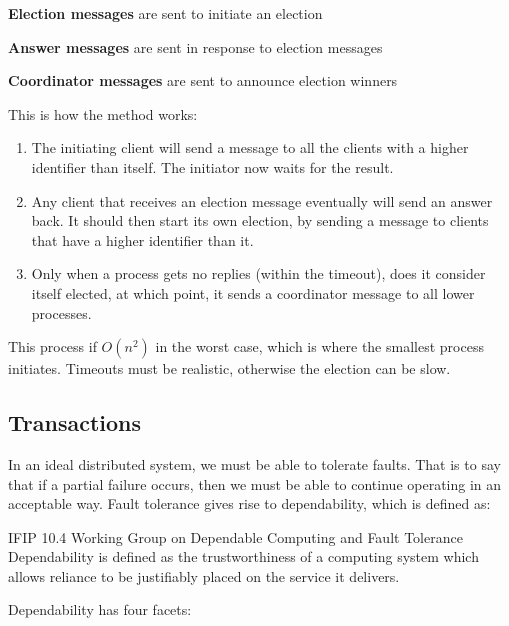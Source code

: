 \begin{description}
  \item \textbf{Election messages} are sent to initiate an election
  \item \textbf{Answer messages} are sent in response to election messages
  \item \textbf{Coordinator messages} are sent to announce election winners
\end{description}

This is how the method works:

\begin{enumerate}
  \item The initiating client will send a message to all the clients with a
  higher identifier than itself. The initiator now waits for the result.

  \item Any client that receives an election message eventually will send an
  answer back. It should then start its own election, by sending a message to
  clients that have a higher identifier than it.

  \item Only when a process gets no replies (within the timeout), does it
  consider itself elected, at which point, it sends a coordinator message to all
  lower processes.
\end{enumerate}

This process if $O(n^2)$ in the worst case, which is where the smallest process
initiates. Timeouts must be realistic, otherwise the election can be slow.

\subsection{Transactions}

In an ideal distributed system, we must be able to tolerate faults. That is to
say that if a partial failure occurs, then we must be able to continue operating
in an acceptable way. Fault tolerance gives rise to dependability, which is
defined as:

\begin{aquote}{IFIP 10.4 Working Group on Dependable Computing and Fault Tolerance}
Dependability is defined as the trustworthiness of a computing system which
allows reliance to be justifiably placed on the service it delivers.
\end{aquote}

Dependability has four facets:

